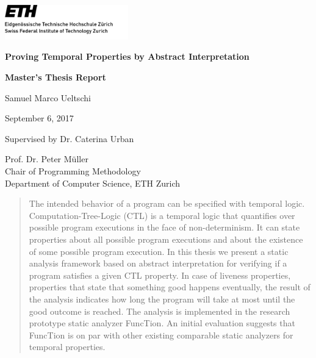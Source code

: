 \documentclass[11pt,a4paper,titlepage]{article}
\theoremstyle{definition}
\begin{document}
\begin{titlepage}

\includegraphics[width=0.4\textwidth]{./logo}

\vspace{3cm}

\centering

{\Huge\textbf{Proving Temporal Properties by Abstract Interpretation}\par} 

\vspace{1cm}

{\huge\textbf{Master's Thesis Report}\par} 

\vspace{1cm}

\begin{LARGE}
    Samuel Marco Ueltschi
\end{LARGE}

\vspace{1cm}

\begin{LARGE}
    September 6, 2017
\end{LARGE}

\vspace{4cm}


\begin{Large}
    Supervised by Dr. Caterina Urban 
\end{Large}

\vspace{2cm}

    Prof. Dr. Peter M\"uller\\
    Chair of Programming Methodology \\
    Department of Computer Science, ETH Zurich\\

\end{titlepage}


\begin{abstract}
    The intended behavior of a program can be specified with temporal logic. Computation-Tree-Logic (CTL) is 
    a temporal logic that quantifies over possible program executions in the face of non-determinism. 
    It can state properties about all possible program executions and about the existence of some possible program execution.
    In this thesis we present a static analysis framework based on abstract interpretation for verifying if a program satisfies a given CTL property. 
    In case of liveness properties, properties that state that something good happens eventually, 
    the result of the analysis indicates how long the program will take at most until the good outcome is reached.
    The analysis is implemented in the research prototype static analyzer FuncTion. An initial evaluation suggests that FuncTion is on 
    par with other existing comparable static analyzers for temporal properties.
\end{abstract}
\end{document}
